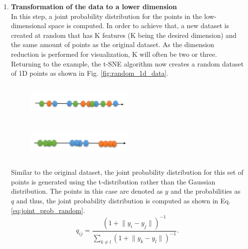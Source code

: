 \begin{enumerate}
    \item \textbf{Transformation of the data to a lower dimension}\\
    In this step, a joint probability distribution for the points in the low-dimensional space is computed. In order to achieve that, a new dataset is created at random that has K features (K being the desired dimension) and the same amount of points as the original dataset. As the dimension reduction is performed for visualization, K will often be two or three. Returning to the example, the \ac{t-SNE} algorithm now creates a random dataset of 1D points as shown in Fig. \ref{fig:random_1d_data}.
    \begin{figure}
        \centering
        \begin{minipage}[t]{.45\textwidth}
          \centering
          \includegraphics[width=150pt,height=50pt]{pictures/random_1d_data.PNG}
          \label{fig:random_1d_data}
        \end{minipage}%
        \hspace{5mm}
        \begin{minipage}[t]{.45\textwidth}
          \centering
          \includegraphics[width=150pt,height=50pt]{pictures/tsne_output.PNG}
          \label{fig:tsne_output}
        \end{minipage}  
    \end{figure}
    Similar to the original dataset, the joint probability distribution for this set of points is generated using the t-distribution rather than the Gaussian distribution. The points in this case are denoted as $y$ and the probabilities as $q$ and thus, the joint probability distribution is computed as shown in Eq. \ref{eq:joint_prob_random}.
    \begin{equation}
        \label{eq:joint_prob_random}
        \mathit{q_{ij}} = \frac{\left(1 + \lVert y_i - y_j \rVert\right) ^{-1}}{\sum_{k \neq l}\left(1 + \lVert y_k - y_l \rVert\right) ^{-1}}.

\end{equation}
\end{enumerate}
